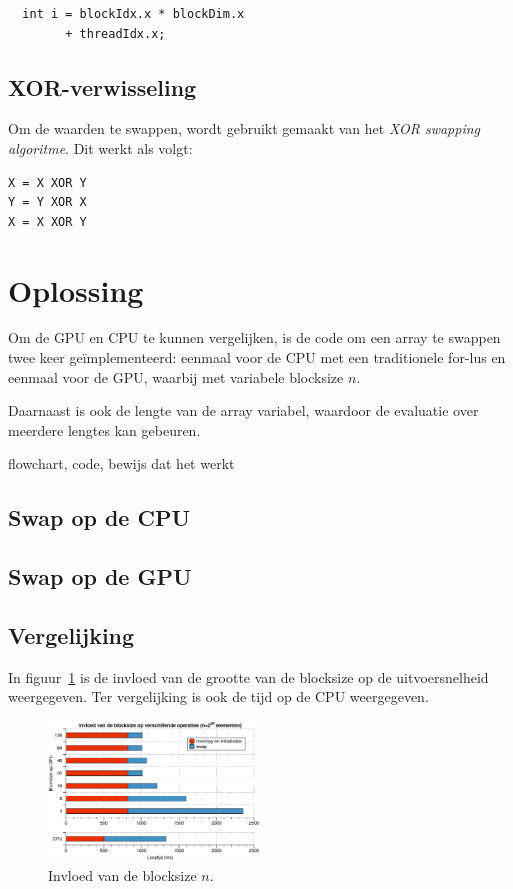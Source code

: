 \documentclass[10pt, twocolumn, a4paper]{article}
\begin{document}
\begin{verbatim}
  int i = blockIdx.x * blockDim.x 
		+ threadIdx.x;
\end{verbatim}

\subsection{XOR-verwisseling}
Om de waarden te swappen, wordt gebruikt gemaakt van het \emph{XOR swapping algoritme}. Dit werkt als volgt:

\begin{verbatim}
X = X XOR Y
Y = Y XOR X
X = X XOR Y
\end{verbatim}

\section{Oplossing}
Om de GPU en CPU te kunnen vergelijken, is de code om een array te swappen twee keer ge\"implementeerd: eenmaal voor de CPU met een traditionele for-lus en eenmaal voor de GPU, waarbij met variabele blocksize $n$.

Daarnaast is ook de lengte van de array variabel, waardoor de evaluatie over meerdere lengtes kan gebeuren.

flowchart, code, bewijs dat het werkt

\subsection{Swap op de CPU}

\subsection{Swap op de GPU}

\subsection{Vergelijking}
In figuur~\ref{blocksize} is de invloed van de grootte van de blocksize op de uitvoersnelheid weergegeven. Ter vergelijking is ook de tijd op de CPU weergegeven.

\begin{figure}
\centering
\includegraphics[width=0.5\textwidth]{blocksize.eps}
\caption{Invloed van de blocksize $n$.}
\label{blocksize}
\end{figure}
\end{document}
